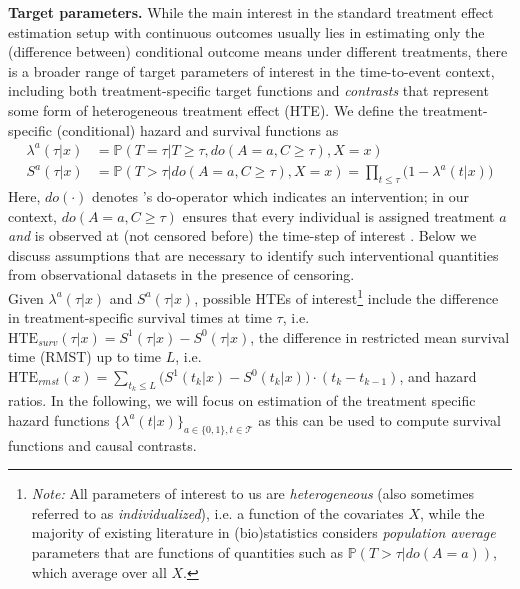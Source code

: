\documentclass{article}
\newcommand{\PR}{{\mathbb P}}
\begin{document}
\textbf{Target parameters.} 
While the main interest in the standard treatment effect estimation setup with continuous outcomes usually lies in estimating only the (difference between) conditional outcome means under different treatments, there is a broader range of target parameters of interest in the time-to-event context, including both treatment-specific target functions and \textit{contrasts} that represent some form of heterogeneous treatment effect (HTE). 
We define the treatment-specific (conditional) hazard and survival functions as 
\begin{equation}
    \begin{split}
    \lambda^{a}(\tau|x) &= \PR(T=\tau | T \geq \tau, do(A=a, C \geq \tau), X=x)\\
    S^{a}(\tau|x) &= \PR(T>\tau| do(A=a, C \geq \tau), X=x) = \prod\nolimits_{t \leq \tau}\big(1 - \lambda^{a}(t| x)\big)
    \end{split}
\end{equation}
Here, $do(\cdot)$ denotes \cite{Pearl:09}'s do-operator which indicates an intervention; in our context, $do(A=a, C \geq \tau)$ ensures that every individual is assigned treatment $a$ \textit{and} is observed at (not censored before) the time-step of interest \cite{stitelman2010collaborative}. Below we discuss assumptions that are necessary to identify such interventional quantities from observational datasets in the presence of censoring. \\
Given $\lambda^{a}(\tau|x)$ and $S^{a}(\tau|x)$, possible HTEs of interest\footnote{\textit{Note:} All parameters of interest to us are \textit{heterogeneous} (also sometimes referred to as \textit{individualized}), i.e. a function of the covariates $X$, while the majority of existing literature in (bio)statistics considers \textit{population average} parameters that are functions of quantities such as $\PR(T>\tau| do(A=a))$, which average over all $X$.} include the difference in treatment-specific survival times at time $\tau$, i.e.
 $\text{HTE}_{surv}(\tau|x) = S^1(\tau|x) - S^0(\tau|x)$, the difference in restricted mean survival time (RMST) up to time $L$, i.e. $\text{HTE}_{rmst}(x)  = \sum_{t_{k} \leq L} \big( S^1(t_{k}|x) - S^0(t_{k}|x) \big) \cdot (t_{k}- t_{k-1})$,  and hazard ratios. In the following, we will focus on estimation of the treatment specific hazard functions $\{\lambda^{a}(t|x)\}_{a\in \{0,1\}, t\in \mathcal{T}}$ as this can be used to compute survival functions and causal contrasts. 
\end{document}
